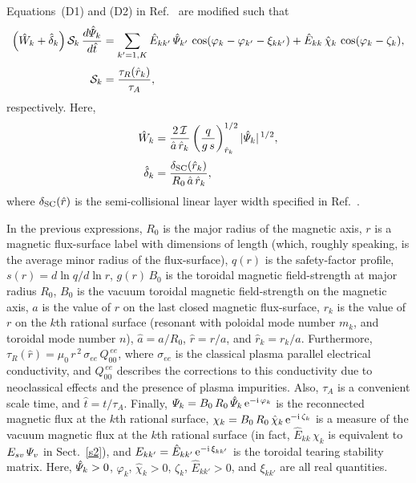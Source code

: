 \documentclass[12pt,prb,aps]{revtex4-1}
\begin{document}
Equations~(D1) and (D2) in Ref.~ are modified such that 
\begin{align}\label{e15}
\left(\hat{W}_k + \hat{\delta}_k\right){\cal S}_k\,\frac{d\hat{\mit\Psi}_k}{d\hat{t}} &= \sum_{k'=1,K}\hat{E}_{kk'}\,\hat{\mit\Psi}_{k'}\,\cos(\varphi_k-\varphi_{k'}-\xi_{kk'})
+\hat{E}_{kk}\,\hat{\chi}_k\,\cos(\varphi_k-\zeta_k),\\[0.5ex]
{\cal S}_k&=\frac{\tau_R(\hat{r}_k)}{\tau_A},
\end{align}
respectively. Here, 
\begin{align}
\hat{W}_k &=\frac{2\,{\cal I}}{\hat{a}\,\hat{r}_k}\left(\frac{q}{g\,s}\right)_{\hat{r}_k}^{1/2} |\hat{\mit\Psi}_k|^{\,1/2},\\[0.5ex]
\hat{\delta}_k &= \frac{\delta_{\rm SC}(\hat{r}_k)}{R_0\,\hat{a}\,\hat{r}_k},
\end{align}
where $\delta_{\rm SC}(\hat{r})$ is the semi-collisional linear layer width specified in Ref.~.

In the previous expressions, $R_0$ is the major radius of the magnetic axis, $r$ is a magnetic flux-surface label with dimensions of length (which, roughly speaking, is the average minor radius of the
flux-surface), $q(r)$ is the safety-factor profile, $s(r)=d\ln q/d\ln r$, 
$g(r)\,B_0$ is the toroidal magnetic field-strength at major radius $R_0$, $B_0$ is the vacuum
toroidal magnetic field-strength on the magnetic axis, $a$ is the value of $r$ on the last closed magnetic flux-surface, $r_k$ is the value of $r$ on the $k$th rational
surface (resonant with poloidal mode number $m_k$, and toroidal mode number $n$), $\hat{a}=a/R_0$, $\hat{r}=r/a$, and $\hat{r}_k=r_k/a$. 
Furthermore, $\tau_R(\hat{r})= \mu_0\,r^{\,2}\,\sigma_{ee}\,Q_{00}^{\,ee}$, where $\sigma_{ee}$ is the classical plasma parallel electrical conductivity, and
$Q_{00}^{\,ee}$ describes the corrections to this conductivity due to neoclassical effects and the presence of plasma impurities. Also, $\tau_A$ is a convenient
scale time, and $\hat{t}=t/\tau_A$. Finally, ${\mit\Psi}_k = B_0\,R_0\,\hat{\mit\Psi}_k\,{\rm e}^{-{\rm i}\,\varphi_k}$ is the reconnected magnetic flux
at the $k$th rational surface, ${\mit\chi}_k = B_0\,R_0\,\hat{\mit\chi}_k\,{\rm e}^{-{\rm i}\,\zeta_k}$ is a measure of the vacuum magnetic flux at the $k$th
rational surface (in fact, $\hat{E}_{kk}\,\chi_k$ is equivalent to $E_{sv}\,{\mit\Psi}_v$ in Sect.~\ref{s2}), and $E_{kk'} =\hat{E}_{kk'}\,{\rm e}^{-{\rm i}\,\xi_{kk'}}$ is the toroidal tearing stability matrix.\cite{am1} Here, $\hat{\mit\Psi}_k>0$, $\varphi_k$, $\hat{\chi}_k>0$,
$\zeta_k$, $\hat{E}_{kk'}>0$, and $\xi_{kk'}$ are all real quantities.
\end{document}
